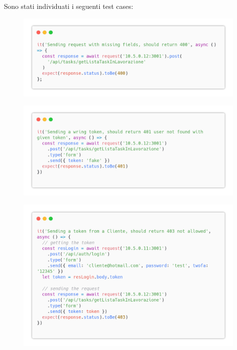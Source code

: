 \documentclass{report}
\begin{document}
Sono stati individuati i seguenti test cases:

\begin{figure}[H]
	\centering\includegraphics[width=1\textwidth]{images/code_in_lavorazione_test1.png}
\end{figure}
\begin{figure}[H]
	\centering\includegraphics[width=1\textwidth]{images/code_in_lavorazione_test2.png}
\end{figure}
\begin{figure}[H]
	\centering\includegraphics[width=1\textwidth]{images/code_in_lavorazione_test3.png}
\end{figure}
\end{document}
